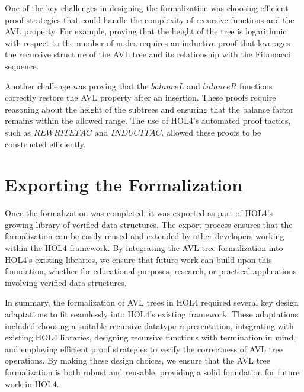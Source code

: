 One of the key challenges in designing the formalization was choosing efficient proof strategies that could handle the complexity of recursive functions and the AVL property. For example, proving that the height of the tree is logarithmic with respect to the number of nodes requires an inductive proof that leverages the recursive structure of the AVL tree and its relationship with the Fibonacci sequence.

Another challenge was proving that the \(balanceL\) and \(balanceR\) functions correctly restore the AVL property after an insertion. These proofs require reasoning about the height of the subtrees and ensuring that the balance factor remains within the allowed range. The use of HOL4’s automated proof tactics, such as \(REWRITE TAC\) and \(INDUCT TAC\), allowed these proofs to be constructed efficiently.

\section{Exporting the Formalization}

Once the formalization was completed, it was exported as part of HOL4’s growing library of verified data structures. The export process ensures that the formalization can be easily reused and extended by other developers working within the HOL4 framework. By integrating the AVL tree formalization into HOL4’s existing libraries, we ensure that future work can build upon this foundation, whether for educational purposes, research, or practical applications involving verified data structures.

In summary, the formalization of AVL trees in HOL4 required several key design adaptations to fit seamlessly into HOL4’s existing framework. These adaptations included choosing a suitable recursive datatype representation, integrating with existing HOL4 libraries, designing recursive functions with termination in mind, and employing efficient proof strategies to verify the correctness of AVL tree operations. By making these design choices, we ensure that the AVL tree formalization is both robust and reusable, providing a solid foundation for future work in HOL4.